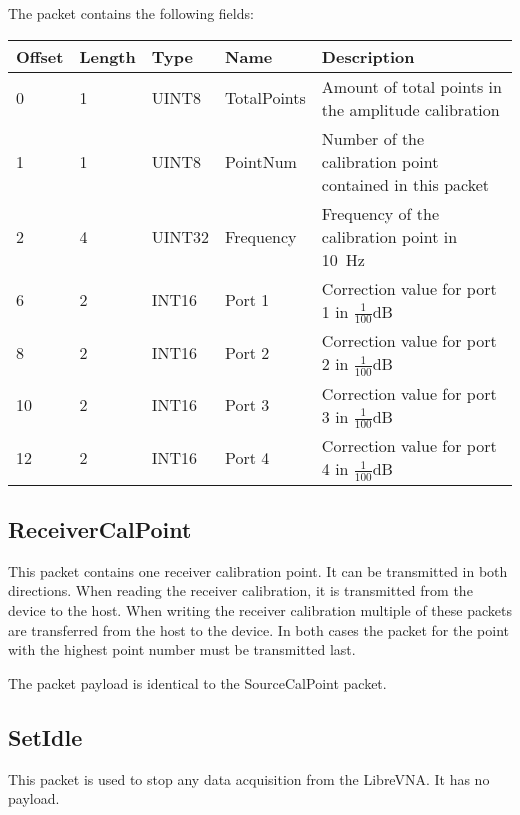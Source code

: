 \documentclass[a4paper,11pt]{article}
\begin{document}
The packet contains the following fields:
\begin{ThreePartTable}
\setlength\tabcolsep{3pt}

\begin{longtable}{p{} |  p{}  |  p{}| p{} | p{}}
\toprule
\textbf{Offset} &\textbf{Length} &\textbf{Type} & \textbf{Name} &\textbf{Description} \\ 
\hline
\endhead
\midrule[\heavyrulewidth]
\endfoot  
\midrule[\heavyrulewidth]
\endlastfoot

0 & 1 & UINT8 & TotalPoints & Amount of total points in the amplitude calibration \\
1 & 1 & UINT8 & PointNum & Number of the calibration point contained in this packet \\
2 & 4 & UINT32 & Frequency & Frequency of the calibration point in \SI{10}{\hertz} \\
6 & 2 & INT16 & Port 1 & Correction value for port 1 in $\frac{1}{100}$dB \\
8 & 2 & INT16 & Port 2 & Correction value for port 2 in $\frac{1}{100}$dB \\
10 & 2 & INT16 & Port 3 & Correction value for port 3 in $\frac{1}{100}$dB \\
12 & 2 & INT16 & Port 4 & Correction value for port 4 in $\frac{1}{100}$dB \\
\end{longtable}   
\end{ThreePartTable}

\subsection{ReceiverCalPoint}
This packet contains one receiver calibration point. It can be transmitted in both directions. When reading the receiver calibration, it is transmitted from the device to the host. When writing the receiver calibration multiple of these packets are transferred from the host to the device. In both cases the packet for the point with the highest point number must be transmitted last.

The packet payload is identical to the SourceCalPoint packet.

\subsection{SetIdle}
This packet is used to stop any data acquisition from the LibreVNA. It has no payload.
\end{document}
